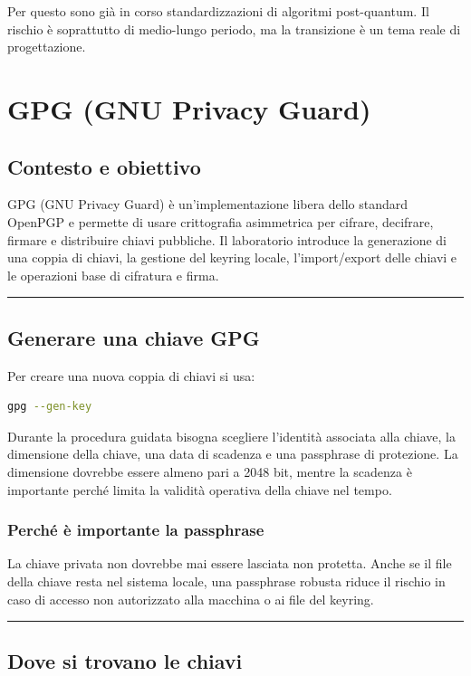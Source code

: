 \documentclass[12pt, a4paper]{report}
\begin{document}
Per questo sono già in corso standardizzazioni di algoritmi post-quantum. Il rischio è soprattutto di medio-lungo periodo, ma la transizione è un tema reale di progettazione.

\chapter{GPG (GNU Privacy Guard)}

\section{Contesto e obiettivo}

GPG (GNU Privacy Guard) è un'implementazione libera dello standard OpenPGP e permette di usare crittografia asimmetrica per cifrare, decifrare, firmare e distribuire chiavi pubbliche. Il laboratorio introduce la generazione di una coppia di chiavi, la gestione del keyring locale, l'import/export delle chiavi e le operazioni base di cifratura e firma.

\noindent\rule{\textwidth}{0.4pt}

\section{Generare una chiave GPG}

Per creare una nuova coppia di chiavi si usa:

\begin{lstlisting}[language=bash]
	gpg --gen-key
\end{lstlisting}

Durante la procedura guidata bisogna scegliere l'identità associata alla chiave, la dimensione della chiave, una data di scadenza e una passphrase di protezione. La dimensione dovrebbe essere almeno pari a 2048 bit, mentre la scadenza è importante perché limita la validità operativa della chiave nel tempo.

\subsection{Perché è importante la passphrase}
La chiave privata non dovrebbe mai essere lasciata non protetta. Anche se il file della chiave resta nel sistema locale, una passphrase robusta riduce il rischio in caso di accesso non autorizzato alla macchina o ai file del keyring.

\noindent\rule{\textwidth}{0.4pt}

\section{Dove si trovano le chiavi}
\end{document}

